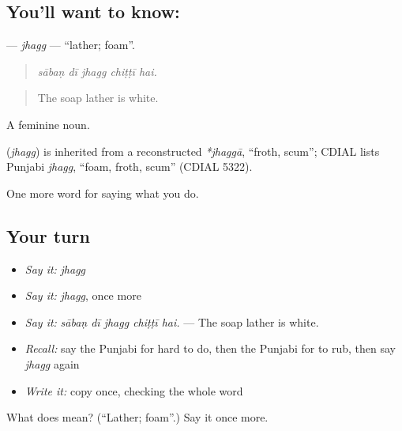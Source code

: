 \subsection*{You'll want to know: }
\textbf{} — \emph{jhagg} — \textquotedblleft{}lather; foam\textquotedblright{}.

\begin{quote}
    
\end{quote}

\begin{quote}
\emph{sābaṇ dī jhagg chiṭṭī hai.}
\end{quote}

\begin{quote}
The soap lather is white.
\end{quote}

A feminine noun.

\begin{cousinweb}
\textbf{} (\emph{jhagg}) is inherited from a reconstructed \emph{*jhaggā}, \textquotedblleft{}froth, scum\textquotedblright{}; CDIAL lists Punjabi \emph{jhagg}, \textquotedblleft{}foam, froth, scum\textquotedblright{} (CDIAL 5322).
\end{cousinweb}

\begin{grammarlens}[title={What you've built}]
One more word for saying what you do.
\end{grammarlens}

\subsection*{Your turn}
\begin{itemize}
\raggedright
  \item \emph{Say it:} \emph{jhagg}
  \item \emph{Say it:} \emph{jhagg}, once more
  \item \emph{Say it:} \emph{sābaṇ dī jhagg chiṭṭī hai.} — The soap lather is white.
  \item \emph{Recall:} say the Punjabi for hard to do, then the Punjabi for to rub, then say \emph{jhagg} again
  \item \emph{Write it:} copy \textbf{} once, checking the whole word
\end{itemize}

\begin{tcolorbox}[breakable,colback=teal!4,colframe=teal!35!black,title={Before you move on}]
What does  mean? (\textquotedblleft{}Lather; foam\textquotedblright{}.) Say it once more.
\end{tcolorbox}
